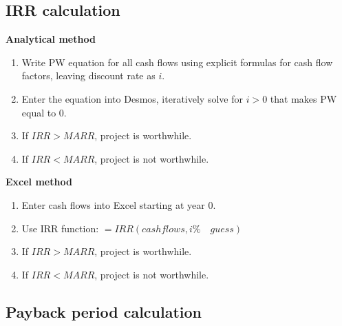 \subsection{IRR calculation}
\begin{process}

    \textbf{Analytical method}
        \begin{enumerate}
            \item Write PW equation for all cash flows using explicit formulas for cash flow factors, leaving discount rate as $i$.
            \item Enter the equation into Desmos, iteratively solve for $i > 0$ that makes PW equal to 0.
            \item If $IRR > MARR$, project is worthwhile.
            \item If $IRR < MARR$, project is not worthwhile.
        \end{enumerate}

    \vspace{1em}
    \textbf{Excel method}
        \begin{enumerate}
            \item Enter cash flows into Excel starting at year 0.
            \item Use IRR function: $=IRR(cashflows, i\% \quad guess)$
            \item If $IRR > MARR$, project is worthwhile.
            \item If $IRR < MARR$, project is not worthwhile.
        \end{enumerate}            
\end{process}

\subsection{Payback period calculation}
